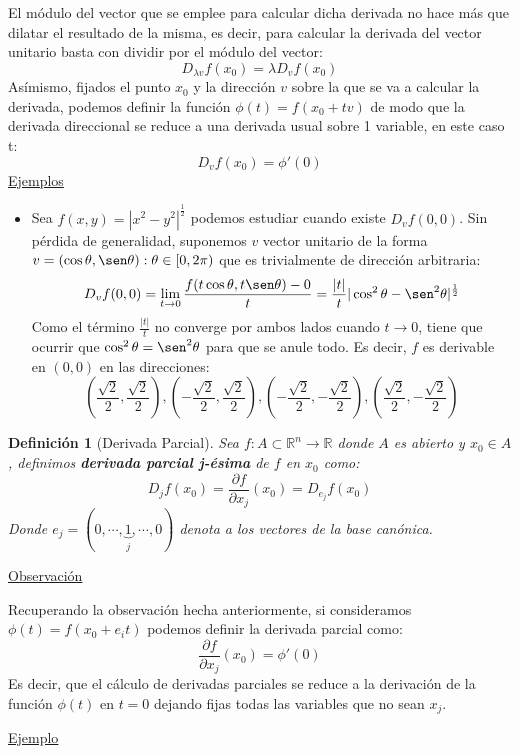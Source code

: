 \documentclass[10pt,a4paper,openright]{book}
\theoremstyle{break}
\newtheorem*{defi}{Definición}
\begin{document}
El módulo del vector que se emplee para calcular dicha derivada no hace más que dilatar el resultado de la misma, es decir, para calcular la derivada del vector unitario basta con dividir por el módulo del vector:
$$D_{\lambda v} f(x_0) = \lambda D_v f(x_0)$$
Asímismo, fijados el punto $x_0$ y la dirección $v$ sobre la que se va a calcular la derivada, podemos definir la función $\phi(t) = f(x_0 + tv)$ de modo que la derivada direccional se reduce a una derivada usual sobre 1 variable, en este caso t:
$$D_v f(x_0) = \phi'(0)$$
\underline{Ejemplos}
\begin{itemize}
\item Sea $f(x,y) = |x^2 - y^2|^{\frac{1}{2}}$ podemos estudiar cuando existe $D_v f(0,0)$. Sin pérdida de generalidad, suponemos $v$ vector unitario de la forma $v = (\cos \theta, \sen \theta) : \theta \in [0,2\pi)$ que es trivialmente de dirección arbitraria:
$$D_vf(0,0) = \lim_{t\rightarrow 0} \frac{f(t\cos\theta , t \sen \theta) - 0}{t} = \frac{|t|}{t} |\cos^2\theta - \sen^2\theta|^\frac{1}{2}$$
Como el término $\frac{|t|}{t}$ no converge por ambos lados cuando $t\rightarrow 0$, tiene que ocurrir que $\cos^2\theta = \sen^2\theta$ para que se anule todo. Es decir, $f$ es derivable en $(0,0)$ en las direcciones:
$$\left( \frac{\sqrt{2}}{2},\frac{\sqrt{2}}{2} \right), \left( -\frac{\sqrt{2}}{2},\frac{\sqrt{2}}{2} \right),\left( -\frac{\sqrt{2}}{2},-\frac{\sqrt{2}}{2} \right),\left( \frac{\sqrt{2}}{2},-\frac{\sqrt{2}}{2} \right)  $$

\end{itemize}

\begin{defi}[Derivada Parcial]
Sea $f: A \subset \mathbb{R}^n \to \mathbb{R}$ donde $A$ es abierto y $x_0 \in A$, definimos \textbf{derivada parcial j-ésima} de $f$ en $x_0$ como:
$$D_j f(x_0) = \frac{\partial f}{\partial x_j} (x_0) = D_{e_j} f(x_0)$$
Donde $e_j = (0, \cdots, \underbrace{1}_{j}, \cdots, 0)$ denota a los vectores de la base canónica.
\end{defi}

\underline{Observación}

Recuperando la observación hecha anteriormente, si consideramos $\phi(t) = f(x_0+e_it)$ podemos definir la derivada parcial como:
$$\frac{\partial f}{\partial x_j} (x_0) =\phi'(0)$$
Es decir, que el cálculo de derivadas parciales se reduce a la derivación de la función $\phi(t)$ en $t=0$ dejando fijas todas las variables que no sean $x_j$.

\underline{Ejemplo}
\end{document}
